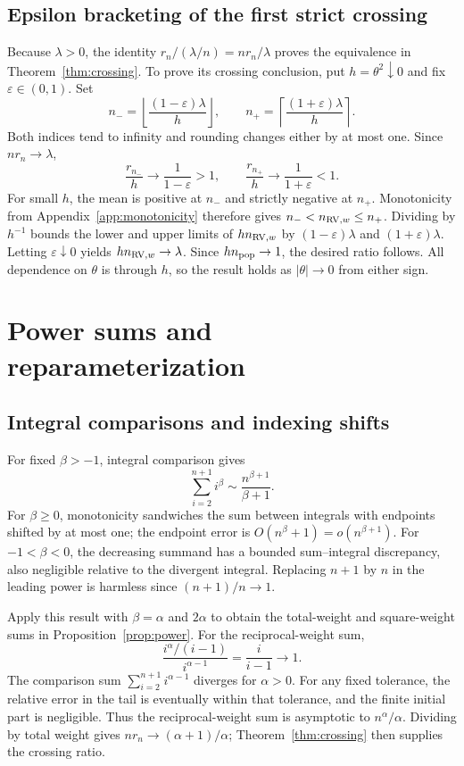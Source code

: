 \documentclass[11pt]{article}
\theoremstyle{definition}
\begin{document}
\subsection{Epsilon bracketing of the first strict crossing}\label{app:bracketing}
Because $\lambda>0$, the identity
$r_n/(\lambda/n)=nr_n/\lambda$ proves the equivalence in
Theorem~\ref{thm:crossing}. To prove its crossing conclusion, put
$h=\theta^2\downarrow0$ and fix $\varepsilon\in(0,1)$. Set
\[
n_- =\left\lfloor\frac{(1-\varepsilon)\lambda}{h}\right\rfloor,
\qquad
n_+ =\left\lceil\frac{(1+\varepsilon)\lambda}{h}\right\rceil.
\]
Both indices tend to infinity and rounding changes either by at most
one. Since $nr_n\to\lambda$,
\[
\frac{r_{n_-}}h\to\frac1{1-\varepsilon}>1,
\qquad
\frac{r_{n_+}}h\to\frac1{1+\varepsilon}<1.
\]
For small $h$, the mean is positive at $n_-$ and strictly negative at
$n_+$. Monotonicity from Appendix~\ref{app:monotonicity} therefore gives
$n_-<n_{{\rm RV},w}\le n_+$. Dividing by $h^{-1}$ bounds the lower and
upper limits of $hn_{{\rm RV},w}$ by $(1-\varepsilon)\lambda$ and
$(1+\varepsilon)\lambda$. Letting $\varepsilon\downarrow0$ yields
$hn_{{\rm RV},w}\to\lambda$. Since $hn_{\rm pop}\to1$, the desired
ratio follows. All dependence on $\theta$ is through $h$, so the result
holds as $|\theta|\to0$ from either sign.

\section{Power sums and reparameterization}

\subsection{Integral comparisons and indexing shifts}\label{app:power-sums}
For fixed $\beta>-1$, integral comparison gives
\[
\sum_{i=2}^{n+1}i^\beta\sim\frac{n^{\beta+1}}{\beta+1}.
\]
For $\beta\ge0$, monotonicity sandwiches the sum between integrals
with endpoints shifted by at most one; the endpoint error is
$O(n^\beta+1)=o(n^{\beta+1})$. For $-1<\beta<0$, the decreasing
summand has a bounded sum--integral discrepancy, also negligible
relative to the divergent integral. Replacing $n+1$ by $n$ in the
leading power is harmless since $(n+1)/n\to1$.

Apply this result with $\beta=\alpha$ and $2\alpha$ to obtain the
total-weight and square-weight sums in Proposition~\ref{prop:power}.
For the reciprocal-weight sum,
\[
\frac{i^\alpha/(i-1)}{i^{\alpha-1}}=\frac{i}{i-1}\to1.
\]
The comparison sum $\sum_{i=2}^{n+1}i^{\alpha-1}$ diverges for
$\alpha>0$. For any fixed tolerance, the relative error in the tail
is eventually within that tolerance, and the finite initial part is
negligible. Thus the reciprocal-weight sum is asymptotic to
$n^\alpha/\alpha$. Dividing by total weight gives
$nr_n\to(\alpha+1)/\alpha$; Theorem~\ref{thm:crossing} then supplies
the crossing ratio.
\end{document}
